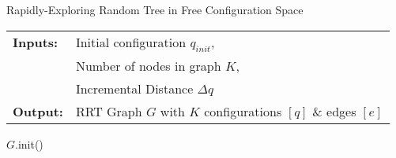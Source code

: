 \bigskip
\begin{algorithm}[H]
    \caption{Rapidly-Exploring Random Tree in Free Configuration Space}
    \SetAlgoLined
    \begin{tabular}{l l}
    \textbf{Inputs:}    & Initial configuration $q_{init}$,\\ 
                        & Number of nodes in graph $K$, \\
                        & Incremental Distance $\Delta q$ \\
    \textbf{Output:}    & RRT Graph $G$ with $K$ configurations $[q]$ \& edges $[e]$ \\
    \end{tabular}

        $G$.init()\;
\label{algorithm:rrt}
\end{algorithm}
\bigskip